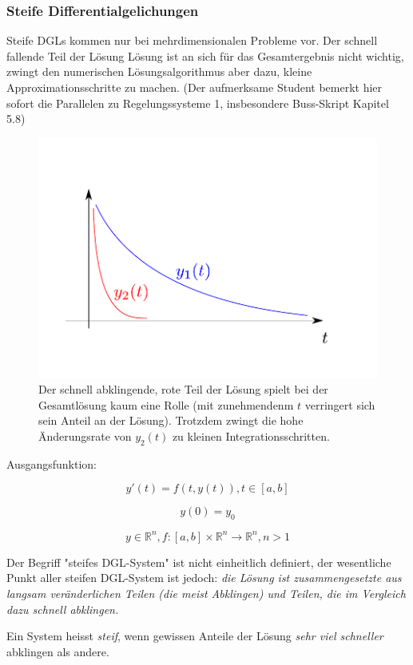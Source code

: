 \documentclass[10pt,a4paper]{article}
\begin{document}
\subsubsection{Steife Differentialgelichungen}
Steife DGLs kommen nur bei mehrdimensionalen Probleme vor. Der schnell fallende Teil der Lösung Lösung ist an sich für das Gesamtergebnis nicht wichtig, zwingt den numerischen Lösungsalgorithmus aber dazu, kleine Approximationsschritte zu machen. (Der aufmerksame Student bemerkt hier sofort die Parallelen zu Regelungssysteme 1, insbesondere Buss-Skript Kapitel 5.8)

\begin{figure}[H]
\includegraphics[width=\textwidth]{images/steife_dgl}
\caption{Der schnell abklingende, rote Teil der Lösung spielt bei der Gesamtlösung kaum eine Rolle (mit zunehmendenm $t$ verringert sich sein Anteil an der Lösung). Trotzdem zwingt die hohe Änderungsrate von $y_2(t)$ zu kleinen Integrationsschritten.}
\end{figure}


Ausgangsfunktion:

$$y'(t) = f(t,y(t)), t\in [a,b]$$

$$y(0)=y_0$$

$$y \in \mathbb{R}^{n}, f:[a,b] \times \mathbb{R}^{n} \rightarrow \mathbb{R}^{n}, n > 1$$

Der Begriff "steifes DGL-System" ist nicht einheitlich definiert, der wesentliche Punkt aller steifen DGL-System ist jedoch: \emph{ die Lösung ist zusammengesetzte aus langsam veränderlichen Teilen (die meist Abklingen) und Teilen, die im Vergleich dazu schnell abklingen.}

\begin{defi}
Ein System heisst \emph{steif}, wenn gewissen Anteile der Lösung \emph{sehr viel schneller} abklingen als andere. 
\end{defi}
\end{document}
